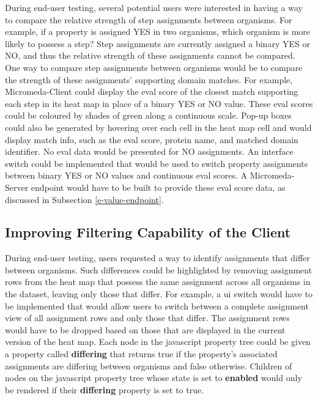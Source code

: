 During end-user testing, several potential users were interested in having a way 
to compare the relative strength of step assignments between organisms. For 
example, if a property is assigned YES in two organisms, which organism is more 
likely to possess a step? Step assignments are currently assigned a binary YES 
or NO, and thus the relative strength of these assignments cannot be compared. 
One way to compare step assignments between organisms would be to compare the 
strength of these assignments' supporting domain matches. For example, 
Micromeda-Client could display the \gls{eval} score of the closest match 
supporting each step in its heat map in place of a binary YES or NO value. These 
\gls{eval} scores could be coloured by shades of green along a continuous scale. 
Pop-up boxes could also be generated by hovering over each cell in the heat map 
cell and would display match info, such as the \gls{eval} score, protein name, 
and matched domain identifier. No \gls{eval} data would be presented for NO 
assignments. An interface switch could be implemented that would be used to 
switch property assignments between binary YES or NO values and continuous 
\gls{eval} scores. A Micromeda-Server endpoint would have to be built to provide 
these \gls{eval} score data, as discussed in Subsection \ref{e-value-endpoint}.

\subsection{Improving Filtering Capability of the Client}

During end-user testing, users requested a way to identify assignments that 
differ between organisms. Such differences could be highlighted by removing 
assignment rows from the heat map that possess the same assignment across all 
organisms in the dataset, leaving only those that differ. For example, a 
\gls{ui} switch would have to be implemented that would allow users to switch 
between a complete assignment view of all assignment rows and only those that 
differ. The assignment rows would have to be dropped based on those that are 
displayed in the current version of the heat map. Each node in the 
\gls{javascript} property tree could be given a property called 
\textbf{differing} that returns true if the property's associated assignments 
are differing between organisms and false otherwise. Children of nodes on the 
\gls{javascript} property tree whose state is set to \textbf{enabled} would only 
be rendered if their \textbf{differing} property is set to true.

